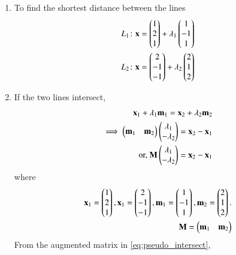 \renewcommand{\theequation}{\theenumi}
\begin{enumerate}[label=\thesection.\arabic*.,ref=\thesection.\theenumi]

\item To find the shortest distance between the lines 
\begin{align}
    L_1\colon \mathbf{x}=\begin{pmatrix}1\\2\\1\end{pmatrix}+\lambda_1\begin{pmatrix}1\\-1\\1\end{pmatrix}\label{eq:pseudo:1}\\
    L_2\colon \mathbf{x}=\begin{pmatrix}2\\-1\\-1\end{pmatrix}+\lambda_2\begin{pmatrix}2\\1\\2\end{pmatrix}\label{eq:pseudo:2}
\end{align}
\item If the two lines intersect,
\begin{align}
\mathbf{x}_1 + \lambda_1 \mathbf{m}_1
=\mathbf{x}_2 + \lambda_2 \mathbf{m}_2
\\
\implies \begin{pmatrix}\mathbf{m}_1 & \mathbf{m}_2\end{pmatrix}\begin{pmatrix}\lambda_1 \\ -\lambda_2\end{pmatrix} = \mathbf{x}_2 - \mathbf{x}_1
\\
\text{or, } \mathbf{M}\begin{pmatrix}\lambda_1 \\ -\lambda_2\end{pmatrix} = \mathbf{x}_2 - \mathbf{x}_1
\label{eq:pseudo_intersect}
\end{align}
%
where 
\begin{align}
\label{eq:pseudo_xm}
\mathbf{x}_1 = \begin{pmatrix}1\\2\\1\end{pmatrix},
\mathbf{x}_1 = \begin{pmatrix}2\\-1\\-1\end{pmatrix},
\mathbf{m}_1 = \begin{pmatrix}1\\-1\\1\end{pmatrix},
\mathbf{m}_2 = \begin{pmatrix}2\\1\\2\end{pmatrix}.
\\
\mathbf{M} =\begin{pmatrix}\mathbf{m}_1 & \mathbf{m}_2\end{pmatrix}
\label{eq:pseudo_rect}
\end{align}
From the augmented matrix in \eqref{eq:pseudo_intersect},
%
\begin{align}

\end{align}
\end{enumerate}
